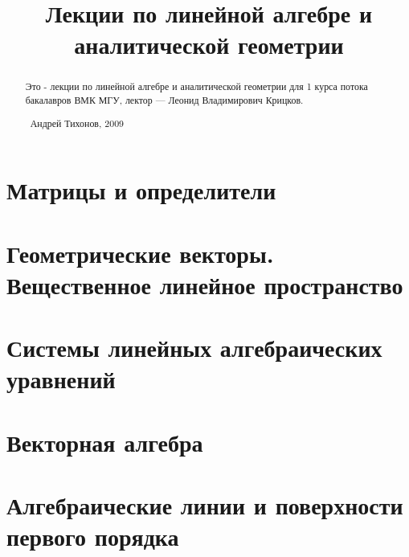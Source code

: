 \documentclass[draft]{report}
\title{Лекции по линейной алгебре и аналитической геометрии}
\theoremstyle{remark}
\begin{document}
\maketitle
\begin{abstract}
Это - лекции по линейной алгебре и аналитической геометрии для 1 курса потока бакалавров ВМК МГУ, лектор --- Леонид Владимирович Крицков.

\textcopyright\ Андрей Тихонов, 2009
\end{abstract}
\tableofcontents
\part{Матрицы и определители}

\part{Геометрические векторы. Вещественное линейное пространство}

\part{Системы линейных алгебраических уравнений}

\part{Векторная алгебра}

\part{Алгебраические линии и поверхности первого порядка}

\end{document}

